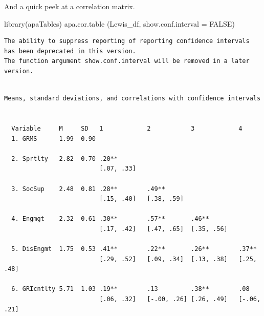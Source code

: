 \documentclass[
]{book}
\newenvironment{Shaded}{\begin{snugshade}}{\end{snugshade}}
\newcommand{\AttributeTok}[1]{\textcolor[rgb]{0.77,0.63,0.00}{#1}}
\newcommand{\ConstantTok}[1]{\textcolor[rgb]{0.00,0.00,0.00}{#1}}
\newcommand{\FunctionTok}[1]{\textcolor[rgb]{0.00,0.00,0.00}{#1}}
\newcommand{\NormalTok}[1]{#1}
\begin{document}
And a quick peek at a correlation matrix.

\begin{Shaded}
\begin{Highlighting}[]
\FunctionTok{library}\NormalTok{(apaTables)}
\FunctionTok{apa.cor.table}\NormalTok{ (Lewis\_df, }\AttributeTok{show.conf.interval =} \ConstantTok{FALSE}\NormalTok{)}
\end{Highlighting}
\end{Shaded}

\begin{verbatim}
The ability to suppress reporting of reporting confidence intervals has been deprecated in this version.
The function argument show.conf.interval will be removed in a later version.
\end{verbatim}

\begin{verbatim}

Means, standard deviations, and correlations with confidence intervals
 

  Variable     M     SD   1            2           3            4           
  1. GRMS      1.99  0.90                                                   
                                                                            
  2. Sprtlty   2.82  0.70 .20**                                             
                          [.07, .33]                                        
                                                                            
  3. SocSup    2.48  0.81 .28**        .49**                                
                          [.15, .40]   [.38, .59]                           
                                                                            
  4. Engmgt    2.32  0.61 .30**        .57**       .46**                    
                          [.17, .42]   [.47, .65]  [.35, .56]               
                                                                            
  5. DisEngmt  1.75  0.53 .41**        .22**       .26**        .37**       
                          [.29, .52]   [.09, .34]  [.13, .38]   [.25, .48]  
                                                                            
  6. GRIcntlty 5.71  1.03 .19**        .13         .38**        .08         
                          [.06, .32]   [-.00, .26] [.26, .49]   [-.06, .21] 
                                                                            

\end{verbatim}
\end{document}
